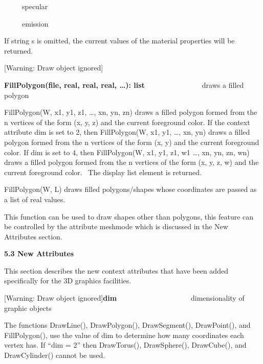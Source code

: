 \documentclass[letterpaper]{article}
\begin{document}
{
\ \ \ \ \ specular\ \ }

{
\ \ \ \ \ emission}


\bigskip

{
If string s is omitted, the current values of the material properties will be returned. }


\bigskip

[Warning: Draw object ignored]

{
\textsf{\textbf{FillPolygon(file, real, real, real, {\dots}): list}}\ \ \ \ \ \  \ \ \ \ \ \ \ \ \ \ draws a filled
polygon}


\bigskip

{
\textsf{FillPolygon(W, x1, y1, z1, {\dots}, xn, yn, zn)} draws a filled polygon formed from the n vertices of the form
(x, y, z) and the current foreground color. If the context attribute \textsf{dim} is set to 2, then
\textsf{FillPolygon(W, x1, y1, {\dots}, xn, yn)} draws a filled polygon formed from the n vertices of the form (x, y)
and the current foreground color. If \textsf{dim} is set to 4, then \textsf{FillPolygon(W, x1, y1, z1, w1 {\dots}, xn,
yn, zn, wn)} draws a filled polygon formed from the n vertices of the form (x, y, z, w) and the current foreground
color. \ The display list element is returned. }

{
FillPolygon(W, L) draws filled polygons/shapes whose coordinates are passed as a list of real values.}


\bigskip

{
This function can be used to draw shapes other than polygons, this feature can be controlled by the attribute
\textsf{meshmode} which is discussed in the New Attributes section.}


\bigskip

{\bfseries
5.3 New Attributes}


\bigskip

{
This section describes the new context attributes that have been added specifically for the 3D graphics facilities. \ }


\bigskip

{
[Warning: Draw object ignored]\textsf{\textbf{dim\ \ \ \ \ \ \ \ \ \ \ \ \ \  \ \ \ \ }}dimensionality of graphic
objects}


\bigskip

{
The functions \textsf{DrawLine(), DrawPolygon(), DrawSegment(), DrawPoint(),} and \textsf{FillPolygon(), }use the value
of \textsf{dim} to determine how many coordinates each vertex has. If \textsf{{}``dim = 2''} then \textsf{DrawTorus(),
DrawSphere(), DrawCube(),} and \textsf{DrawCylinder()} cannot be used. \ }
\end{document}
